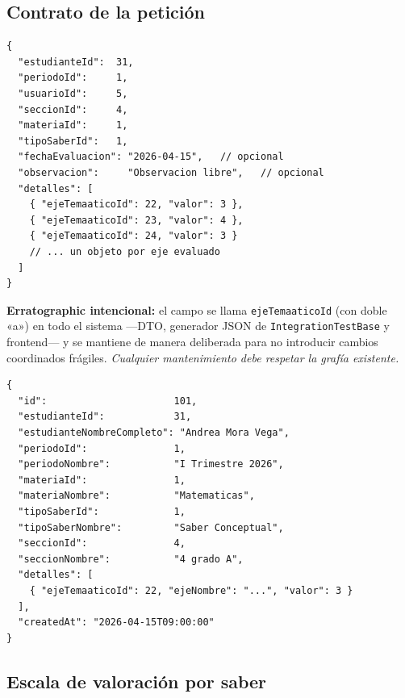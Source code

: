\documentclass[11pt,a4paper,oneside]{article}
\newcommand{\code}[1]{\texttt{\small #1}}
\begin{document}
\subsection{Contrato de la petición}

\begin{lstlisting}[style=json,caption={POST \code{/api/evaluaciones-saber} — \emph{Request body}}]
{
  "estudianteId":  31,
  "periodoId":     1,
  "usuarioId":     5,
  "seccionId":     4,
  "materiaId":     1,
  "tipoSaberId":   1,
  "fechaEvaluacion": "2026-04-15",   // opcional
  "observacion":     "Observacion libre",   // opcional
  "detalles": [
    { "ejeTemaaticoId": 22, "valor": 3 },
    { "ejeTemaaticoId": 23, "valor": 4 },
    { "ejeTemaaticoId": 24, "valor": 3 }
    // ... un objeto por eje evaluado
  ]
}
\end{lstlisting}

\begin{ataraNota}
\textbf{Erratographic intencional:} el campo se llama \code{ejeTemaaticoId} (con doble «a»)
en todo el sistema —DTO, generador JSON de \code{IntegrationTestBase} y frontend— y se
mantiene de manera deliberada para no introducir cambios coordinados frágiles. \emph{Cualquier
mantenimiento debe respetar la grafía existente.}
\end{ataraNota}

\begin{lstlisting}[style=json,caption={POST \code{/api/evaluaciones-saber} — \emph{Response body} (201 Created)}]
{
  "id":                      101,
  "estudianteId":            31,
  "estudianteNombreCompleto": "Andrea Mora Vega",
  "periodoId":               1,
  "periodoNombre":           "I Trimestre 2026",
  "materiaId":               1,
  "materiaNombre":           "Matematicas",
  "tipoSaberId":             1,
  "tipoSaberNombre":         "Saber Conceptual",
  "seccionId":               4,
  "seccionNombre":           "4 grado A",
  "detalles": [
    { "ejeTemaaticoId": 22, "ejeNombre": "...", "valor": 3 }
  ],
  "createdAt": "2026-04-15T09:00:00"
}
\end{lstlisting}

\subsection{Escala de valoración por saber}
\end{document}
